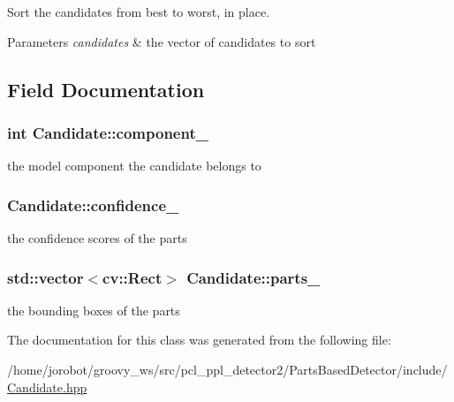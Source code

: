 \-Sort the candidates from best to worst, in place. 


\begin{DoxyParams}{\-Parameters}
{\em candidates} & the vector of candidates to sort \\
\hline
\end{DoxyParams}


\subsection{\-Field \-Documentation}
\hypertarget{classCandidate_a7866513384d74055891a237a524798ab}{
\subsubsection[{component\-\_\-}]{\setlength{\rightskip}{0pt plus 5cm}int {\bf \-Candidate\-::component\-\_\-}}}\label{classCandidate_a7866513384d74055891a237a524798ab}


the model component the candidate belongs to 

\hypertarget{classCandidate_a31785654c1d01cda9cadf93e919b30f1}{
\subsubsection[{confidence\-\_\-}]{ {\bf \-Candidate\-::confidence\-\_\-}}}\label{classCandidate_a31785654c1d01cda9cadf93e919b30f1}


the confidence scores of the parts 

\hypertarget{classCandidate_aa0e3d40adf86bff2e99f3e4234ce674b}{
\subsubsection[{parts\-\_\-}]{\setlength{\rightskip}{0pt plus 5cm}std\-::vector$<$cv\-::\-Rect$>$ {\bf \-Candidate\-::parts\-\_\-}}}\label{classCandidate_aa0e3d40adf86bff2e99f3e4234ce674b}


the bounding boxes of the parts 



\-The documentation for this class was generated from the following file\-:\begin{DoxyCompactItemize}
\item 
/home/jorobot/groovy\-\_\-ws/src/pcl\-\_\-ppl\-\_\-detector2/\-Parts\-Based\-Detector/include/\hyperlink{Candidate_8hpp}{\-Candidate.\-hpp}\end{DoxyCompactItemize}
